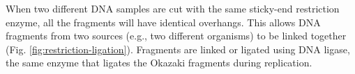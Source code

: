 \documentclass[nofonts,]{tufte-handout}
\begin{document}
\begin{marginfigure}
\end{marginfigure}

When two different DNA samples are cut with the same sticky-end
restriction enzyme, all the fragments will have identical overhangs.
This allows DNA fragments from two sources (e.g., two different
organisms) to be linked together (Fig. \ref{fig:restriction-ligation}).
Fragments are linked or ligated using DNA ligase, the same enzyme that
ligates the Okazaki fragments during replication.


\end{document}
